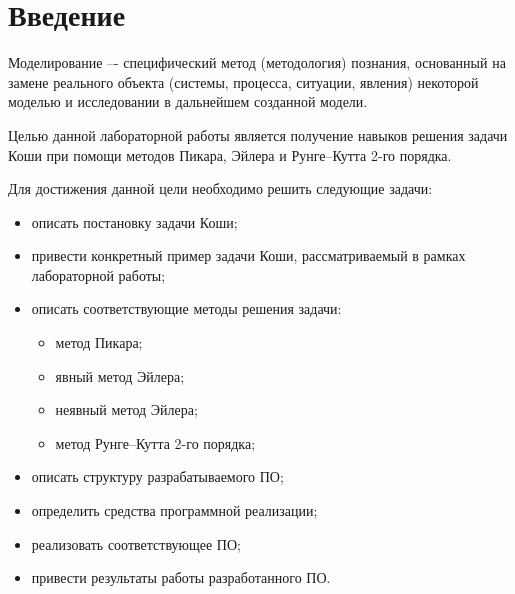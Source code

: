 \chapter*{Введение}

Моделирование –- специфический метод (методология) познания, основанный на замене
реального объекта (системы, процесса, ситуации, явления) некоторой моделью и исследовании
в дальнейшем созданной модели.

Целью данной лабораторной работы является получение навыков решения задачи Коши при помощи методов Пикара, Эйлера и Рунге--Кутта 2-го порядка.

Для достижения данной цели необходимо решить следующие задачи:

\begin{itemize}
    \item описать постановку задачи Коши;
    \item привести конкретный пример задачи Коши, рассматриваемый в рамках лабораторной работы;
    \item описать соответствующие методы решения задачи:
        \begin{itemize}
            \item метод Пикара;
            \item явный метод Эйлера;
            \item неявный метод Эйлера;
            \item метод Рунге--Кутта 2-го порядка;
        \end{itemize}
	\item описать структуру разрабатываемого ПО;
	\item определить средства программной реализации;
    \item реализовать соответствующее ПО;
	\item привести результаты работы разработанного ПО.
\end{itemize}
